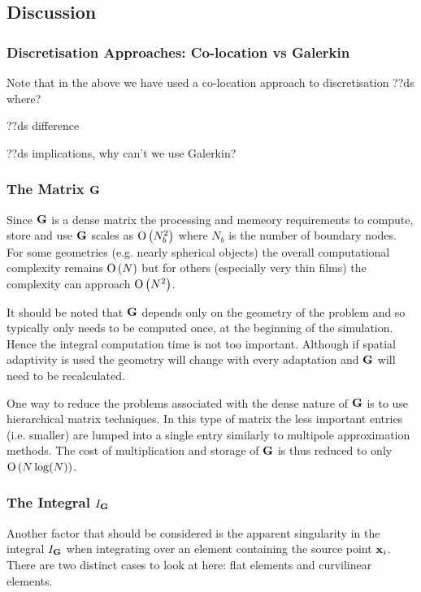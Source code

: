 \subsection{Discussion}

\subsubsection{Discretisation Approaches: Co-location vs Galerkin}

Note that in the above we have used a co-location approach to discretisation
??ds where?

??ds difference

??ds implications, why can't we use Galerkin?

\subsubsection{The Matrix ${\mathbf{G}}$}
Since ${\mathbf{G}}$ is a dense matrix the processing and memeory requirements to compute, store and use ${\mathbf{G}}$ scales as $\text{O} \left( N_b^2 \right)$ where $N_b$ is the number of boundary nodes. For some geometries (e.g. nearly spherical objects) the overall computational complexity remains $\text{O} \left( N \right)$ but for others (especially very thin films) the complexity can approach $\text{O} \left( N^2 \right)$.

It should be noted that ${\mathbf{G}}$ depends only on the geometry of the problem and so typically only needs to be computed once, at the beginning of the simulation. Hence the integral computation time is not too important. Although if spatial adaptivity is used the geometry will change with every adaptation and ${\mathbf{G}}$ will need to be recalculated.

One way to reduce the problems associated with the dense nature of ${\mathbf{G}}$ is to use hierarchical matrix techniques. In this type of matrix the less important entries (i.e. smaller) are lumped into a single entry similarly to multipole approximation methods. The cost of multiplication and storage of ${\mathbf{G}}$ is thus reduced to only $\text{O} \left( N \log(N) \right)$.\cite{Knittel2009}

\subsubsection{The Integral $I_{\mathbf{G}}$}
Another factor that should be considered is the apparent singularity in the integral $I_{\mathbf{G}}$ when integrating over an element containing the source point $\mathbf{x}_{i}$. There are two distinct cases to look at here: flat elements and curvilinear elements.

